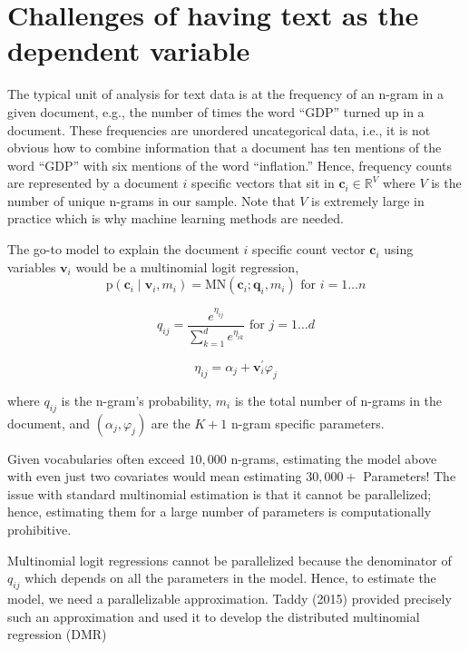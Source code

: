 \documentclass[
]{book}
\begin{document}
\hypertarget{challenges-of-having-text-as-the-dependent-variable}{%
\section{Challenges of having text as the dependent variable}\label{challenges-of-having-text-as-the-dependent-variable}}

The typical unit of analysis for text data is at the frequency of an n-gram in a given document, e.g., the number of times the word ``GDP'' turned up in a document. These frequencies are unordered uncategorical data, i.e., it is not obvious how to combine information that a document has ten mentions of the word ``GDP'' with six mentions of the word ``inflation.'' Hence, frequency counts are represented by a document \(i\) specific vectors that sit in \(\mathbf{c}_{i}\in\mathbb{R}^V\) where \(V\) is the number of unique n-grams in our sample. Note that \(V\) is extremely large in practice which is why machine learning methods are needed.

The go-to model to explain the document \(i\) specific count vector \(\mathbf{c}_{i}\) using variables \(\mathbf{v}_{i}\) would be a multinomial logit regression,
\[
\mathrm{p}\left(\mathbf{c}_{i} \mid \mathbf{v}_{i}, m_{i}\right) = \mathrm{MN}\left(\mathbf{c}_{i} ; \mathbf{q}_{i}, m_{i}\right) \text{ for } i=1 \ldots n
\]

\[
q_{i j} = \frac{e^{\eta_{i j}}}{\sum_{k=1}^{d} e^{\eta_{i k}}} \text { for } j=1 \ldots d
\]

\[
\eta_{i j} = \alpha_{j}+\mathbf{v}_{i}^{\prime} \varphi_{j}
\]

where \(q_{i j}\) is the n-gram's probability, \(m_i\) is the total number of n-grams in the document, and \((\alpha_j,\varphi_j)\) are the \(K+1\) n-gram specific parameters.

Given vocabularies often exceed \(10,000\) n-grams, estimating the model above with even just two covariates would mean estimating \(30,000+\) Parameters! The issue with standard multinomial estimation is that it cannot be parallelized; hence, estimating them for a large number of parameters is computationally prohibitive.

Multinomial logit regressions cannot be parallelized because the denominator of \(q_{ij}\) which depends on all the parameters in the model. Hence, to estimate the model, we need a parallelizable approximation. Taddy (2015) provided precisely such an approximation and used it to develop the distributed multinomial regression (DMR)
\end{document}
